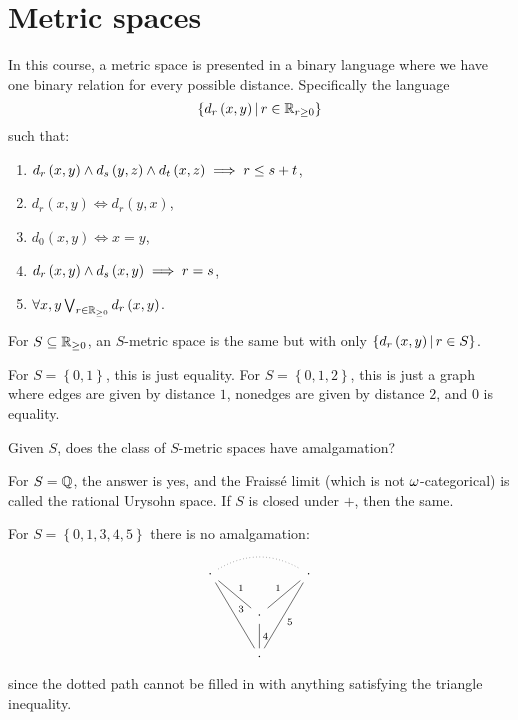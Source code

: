 \documentclass{amsart}
\begin{document}
\section{Metric spaces}

In this course, a metric space is presented in a binary language
where we have one binary relation for every possible distance.
Specifically the language
\begin{equation}
\left\{ d_r\left( x,y \right) \, \middle\vert \, r\in \mathbb{R}_{r\geq 0} \right\}
\end{equation}
such that:
\begin{enumerate}[label=(\iii)]
\item $d_r\left( x,y \right) \wedge
d_s\left( y,z \right) \wedge d_t\left( x,z \right) \implies r\leq s+t$,
\item $d_r\left( x,y \right) \iff d_r\left( y,x \right)$,
\item $d_0\left( x,y \right) \iff x=y$,
\item $d_r\left( x,y \right) \wedge d_s\left( x,y \right) \implies  r = s$,
\item $\forall x,y\bigvee_{r\in \mathbb{R}_{\geq 0}} d_r\left( x,y \right)$.
\end{enumerate}
For $S\subseteq \mathbb{R}_{\geq 0}$, an $S$-metric space is the same 
but with only $\left\{ d_r\left( x,y \right) \, \middle\vert \, r\in S \right\}$.

\begin{exm}
For $S = \left\{ 0,1 \right\}$, this is just equality.
For $S = \left\{ 0,1,2 \right\}$, this is just a graph where
edges are given by distance $1$, nonedges are given by distance $2$, 
and $0$ is equality.
\end{exm}

\begin{qn}
Given $S$, does the class of $S$-metric spaces have amalgamation?
\end{qn}

For $S = \mathbb{Q}$, the answer is yes, and the Fraiss\'e limit 
(which is not $\omega$-categorical) is called the rational Urysohn space.
If $S$ is closed under $+$, then the same. 
\begin{exm}
For $S = \left\{ 0,1,3,4,5 \right\}$ there is no amalgamation:
\begin{equation}
\begin{tikzcd}
\cdot \arrow[dash]{dr}{1}\arrow[dash]{ddr}{3}\arrow[bend left,dotted,no head]{rr}&&
\cdot\arrow[dash]{ddl}{5}\arrow[dash,"1"']{dl}\\
& \cdot \arrow[dash]{d}{4}&\\
& \cdot &
\end{tikzcd}
\end{equation}
since the dotted path cannot be filled in with anything satisfying the triangle
inequality.
\end{exm}
\end{document}
